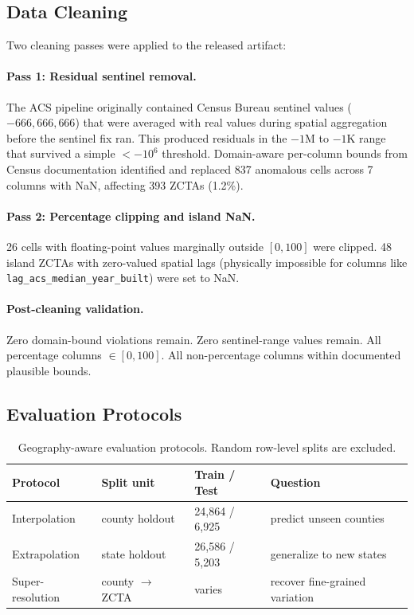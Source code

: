 \documentclass{article}
\begin{document}
\subsection{Data Cleaning}

Two cleaning passes were applied to the released artifact:

\paragraph{Pass 1: Residual sentinel removal.}
The ACS pipeline originally contained Census Bureau sentinel values ($-666{,}666{,}666$) that were averaged with real values during spatial aggregation before the sentinel fix ran. This produced residuals in the $-1$M to $-1$K range that survived a simple $< -10^6$ threshold. Domain-aware per-column bounds from Census documentation identified and replaced 837 anomalous cells across 7 columns with NaN, affecting 393 ZCTAs (1.2\%).

\paragraph{Pass 2: Percentage clipping and island NaN.}
26 cells with floating-point values marginally outside $[0, 100]$ were clipped. 48 island ZCTAs with zero-valued spatial lags (physically impossible for columns like \texttt{lag\_acs\_median\_year\_built}) were set to NaN.

\paragraph{Post-cleaning validation.} Zero domain-bound violations remain. Zero sentinel-range values remain. All percentage columns $\in [0, 100]$. All non-percentage columns within documented plausible bounds.

\subsection{Evaluation Protocols}

\begin{table}[htbp]
\centering
\small
\caption{Geography-aware evaluation protocols. Random row-level splits are excluded.}
\label{tab:eval_protocols}
\begin{tabular}{llll}
\toprule
\textbf{Protocol} & \textbf{Split unit} & \textbf{Train / Test} & \textbf{Question} \\
\midrule
Interpolation & county holdout & 24,864 / 6,925 & predict unseen counties \\
Extrapolation & state holdout & 26,586 / 5,203 & generalize to new states \\
Super-resolution & county $\to$ ZCTA & varies & recover fine-grained variation \\
\bottomrule
\end{tabular}
\end{table}
\end{document}
